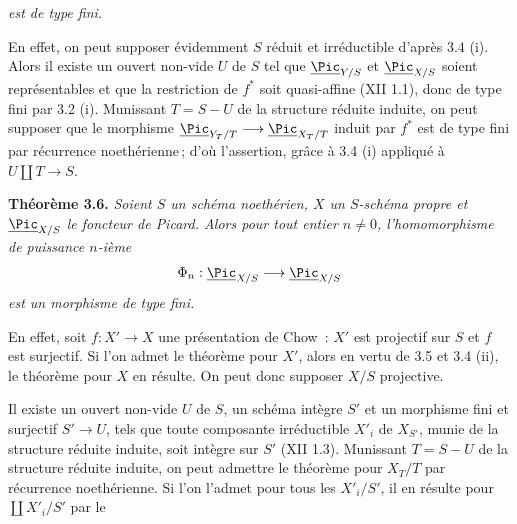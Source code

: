 
\emph{est de type fini.}

En effet, on peut supposer \'evidemment \(S\) r\'eduit et irr\'eductible d'apr\`es 3.4 (i). Alors il existe un ouvert non-vide \(U\) de \(S\) tel que \(\underline{\Pic}_{Y/S}\) et \(\underline{\Pic}_{X/S}\) soient repr\'esentables et que la restriction de \(f^*\) soit quasi-affine (XII 1.1), donc de type fini par 3.2 (i). Munissant \(T=S-U\) de la structure r\'eduite induite, on peut supposer que le morphisme \(\underline{\Pic}_{Y_T/T}\longrightarrow\underline{\Pic}_{X_T/T}\) induit par \(f^*\) est de type fini par r\'ecurrence noeth\'erienne\,; d'o\`u l'assertion, gr\^ace \`a 3.4 (i) appliqu\'e \`a \(U\amalg T\to S\).

\textbf{Th\'eor\`eme 3.6.} \emph{Soient \(S\) un sch\'ema noeth\'erien, \(X\) un \(S\)-sch\'ema propre et \(\underline{\Pic}_{X/S}\) le foncteur de Picard. Alors pour tout entier \(n\ne0\), l'homomorphisme de puissance \(n\)-i\`eme}
\[
\Phi_n:\underline{\Pic}_{X/S}\longrightarrow\underline{\Pic}_{X/S}
\]
\emph{est un morphisme de type fini.}

En effet, soit \(f:X'\to X\) une pr\'esentation de Chow~: \(X'\) est projectif sur \(S\) et \(f\) est surjectif. Si l'on admet le th\'eor\`eme pour \(X'\), alors en vertu de 3.5 et 3.4 (ii), le th\'eor\`eme pour \(X\) en r\'esulte. On peut donc supposer \(X/S\) projective.

Il existe un ouvert non-vide \(U\) de \(S\), un sch\'ema int\`egre \(S'\) et un morphisme fini et surjectif \(S'\to U\), tels que toute composante irr\'eductible \(X'_i\) de \(X_{S'}\), munie de la structure r\'eduite induite, soit int\`egre sur \(S'\) (XII 1.3). Munissant \(T=S-U\) de la structure r\'eduite induite, on peut admettre le th\'eor\`eme pour \(X_T/T\) par r\'ecurrence noeth\'erienne. Si l'on l'admet pour tous les \(X'_i/S'\), il en r\'esulte pour \(\coprod X'_i/S'\) par le
